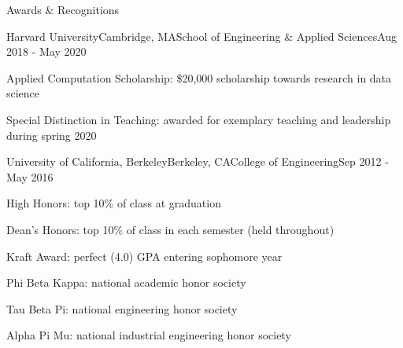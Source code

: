 \documentclass{resume} %
\begin{document}
\begin{rSection}{Awards \& Recognitions}

\begin{rSubsection}{Harvard University}{Cambridge, MA}{School of Engineering \& Applied Sciences}{Aug 2018 - May 2020}
	\item Applied Computation Scholarship: \$20,000 scholarship towards research in data science
       	\item Special Distinction in Teaching: awarded for exemplary teaching and leadership during spring 2020
\end{rSubsection}

\begin{rSubsection}{University of California, Berkeley}{Berkeley, CA}{College of Engineering}{Sep 2012 - May 2016}
	\item High Honors: top 10\% of class at graduation
        \item Dean's Honors: top 10\% of class in each semester (held throughout)
        \item Kraft Award: perfect (4.0) GPA entering sophomore year
        \item Phi Beta Kappa: national academic honor society
	\item Tau Beta Pi: national engineering honor society
        \item Alpha Pi Mu: national industrial engineering honor society
\end{rSubsection}




\end{rSection}
\end{document}
